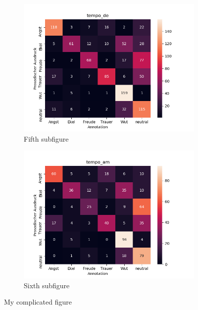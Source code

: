 \documentclass[11pt,a4paper,headsepline,twoside,toc=bibliography]{scrreprt}
\begin{document}
\begin{figure}[t!]
	\medskip
	\begin{subfigure}{0.48\textwidth}
		\includegraphics[width=\linewidth]{plots/heatmap/conf_tempo_de.png}
		\caption{Fifth subfigure} \label{fig:conf_tempo_de}
	\end{subfigure}\hspace*{\fill}
	\begin{subfigure}{0.48\textwidth}
		\includegraphics[width=\linewidth]{plots/heatmap/conf_tempo_am.png}
		\caption{Sixth subfigure} \label{fig:conf_tempo_am}
	\end{subfigure}
	
	\caption{My complicated figure} \label{fig:confusion_heatmap}
\end{figure}
\end{document}
